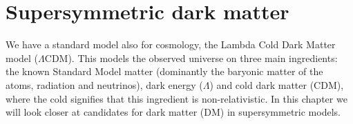 \documentclass[notes.tex]{subfiles}
\begin{document}
\chapter{Supersymmetric dark matter}
\label{chap:dm}

We have a standard model also for cosmology, the Lambda Cold Dark Matter model ($\Lambda$CDM). This models the observed universe on three main ingredients: the known Standard Model matter (dominantly the baryonic matter of the atoms, radiation and neutrinos), dark energy ($\Lambda$) and cold dark matter (CDM), where the cold signifies that this ingredient is non-relativistic. In this chapter we will look closer at candidates for dark matter (DM) in supersymmetric models.



\end{document}
